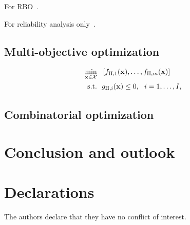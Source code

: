 \documentclass[iicol,sn-basic]{sn-jnl}%
\theoremstyle{thmstyleone}%
\theoremstyle{thmstyletwo}
\theoremstyle{thmstylethree}
\begin{document}
\begin{linenumbers}
For RBO~\cite{Yoo2021}.

For reliability analysis only~\cite{Chaudhuri2021,Patsialis2021,CZhang2022,Skandalos2022,AshwinRenganathan2023}.

\subsection{Multi-objective optimization}\label{Sec74}
\cite{Singh2017,Amrit2018,Khatamsaz2021}

\begin{equation}\label{Eq72}
	\begin{aligned}
		\underset{{\bf x} \in \mathcal{X}}{\min} \ \ & \left[f_{\text{H},1}({\bf x}),\dots,f_{\text{H},m}({\bf x})\right]\\
		\textrm{s.t.} \ \ 
		& g_{\text{H},i}({\bf x}) \leq 0,\ \ i=1,\dots,I, 
	\end{aligned}
\end{equation}

\subsection{Combinatorial optimization}\label{Sec75}

\section{Conclusion and outlook}\label{Sec8}




\section*{Declarations}
The authors declare that they have no conflict of interest.


\begin{appendices}


\end{appendices}
\end{linenumbers}
\end{document}
